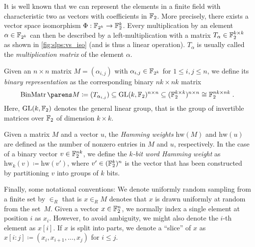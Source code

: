 It is well known that we can represent the elements in a finite field with characteristic two as vectors with coefficients in $\mathbb{F}_2$.
More precisely, there exists a vector space isomorphism $\Phi: \mathbb{F}_{2^k} \to \mathbb{F}_2^k$.
Every multiplication by an element $\alpha \in \mathbb{F}_{2^k}$ can then be described by a left-multiplication with a matrix $T_{\alpha} \in \mathbb{F}_2^{k \times k}$ as shown in \cref{fig:slps:vs_iso} (and is thus a linear operation).
$T_{\alpha}$ is usually called the \emph{multiplication matrix} of the element $\alpha$.

Given an $n \times n$ matrix $M = (\alpha_{i,j})$ with $\alpha_{i,j} \in \mathbb{F}_{2^k}$ for $1 \leq i,j \leq n$, we define its \emph{binary representation} as the corresponding binary $nk \times nk$ matrix
\begin{equation*}
    \binarymatrix{M} \coloneqq (T_{\alpha_{i,j}}) \subseteq \GL{k}^{n \times n} \subseteq (\F_2^{k \times k})^{n \times n} \cong \F_2^{nk \times nk}\;.
\end{equation*}
Here, $\mathrm{GL}(k, \mathbb{F}_2)$ denotes the general linear group, that is the group of invertible matrices over $\mathbb{F}_2$ of dimension $k \times k$.

Given a matrix $M$ and a vector $u$, the \emph{Hamming weights} $\mathrm{hw}(M)$ and $\mathrm{hw}(u)$ are defined as the number of nonzero entries in $M$ and $u$, respectively.
In the case of a binary vector $v \in \mathbb{F}_2^{nk}$, we define the \emph{$k$-bit word Hamming weight} as $\mathrm{hw}_k(v) \coloneqq \mathrm{hw}(v')$, where $v' \in (\mathbb{F}_2^k)^n$ is the vector that has been constructed by partitioning $v$ into groups of $k$ bits.

Finally, some notational conventions:
We denote uniformly random sampling from a finite set by $\in_R$ that is $x \in_R M$ denotes that $x$ is drawn uniformly at random from the set~$M$.
Given a vector $x \in \mathbb{F}_2^n$, we normally index a single element at position $i$ as $x_i$.
However, to avoid ambiguity, we might also denote the $i$-th element as $x[i]$.
If $x$ is split into parts, we denote a \enquote{slice} of $x$ as $x[i:j] \coloneqq (x_i, x_{i+1}, \ldots, x_j)$ for $i \leqslant j$.

